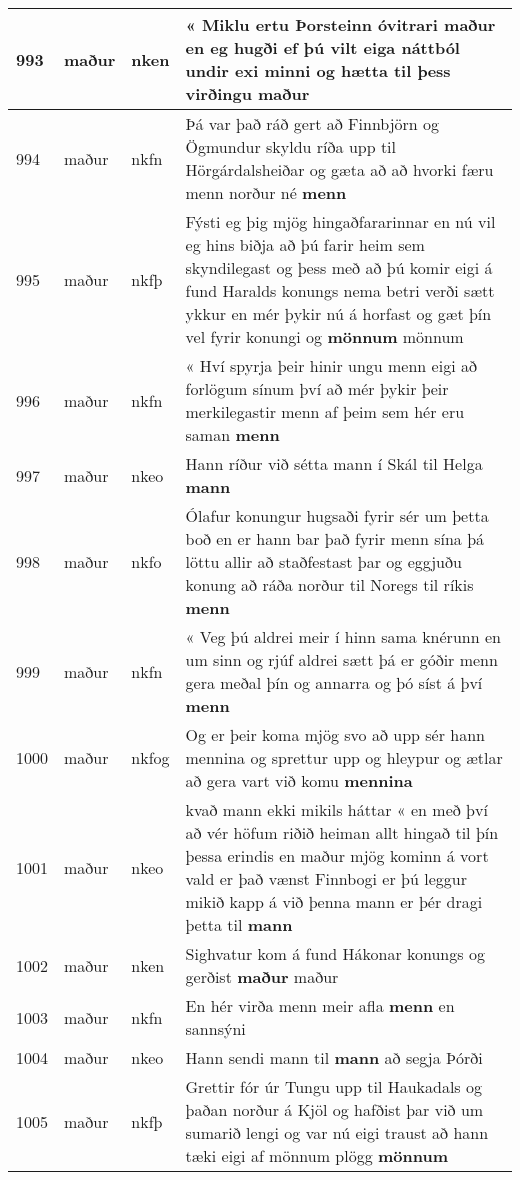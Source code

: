 \documentclass{article}
\begin{document}
\begin{longtable}{p{1cm}|p{1cm}|p{1cm}|p{13cm}}
\hline
993&maður&nken&« Miklu ertu Þorsteinn óvitrari maður en eg hugði ef þú vilt eiga náttból undir exi minni og hætta til þess virðingu \textbf{maður} \\
\hline
994&maður&nkfn&Þá var það ráð gert að Finnbjörn og Ögmundur skyldu ríða upp til Hörgárdalsheiðar og gæta að að hvorki færu menn norður né \textbf{menn} \\
\hline
995&maður&nkfþ&Fýsti eg þig mjög hingaðfararinnar en nú vil eg hins biðja að þú farir heim sem skyndilegast og þess með að þú komir eigi á fund Haralds konungs nema betri verði sætt ykkur en mér þykir nú á horfast og gæt þín vel fyrir konungi og \textbf{mönnum} mönnum\\
\hline
996&maður&nkfn&« Hví spyrja þeir hinir ungu menn eigi að forlögum sínum því að mér þykir þeir merkilegastir menn af þeim sem hér eru saman \textbf{menn} \\
\hline
997&maður&nkeo&Hann ríður við sétta mann í Skál til Helga \textbf{mann} \\
\hline
998&maður&nkfo&Ólafur konungur hugsaði fyrir sér um þetta boð en er hann bar það fyrir menn sína þá löttu allir að staðfestast þar og eggjuðu konung að ráða norður til Noregs til ríkis \textbf{menn} \\
\hline
999&maður&nkfn&« Veg þú aldrei meir í hinn sama knérunn en um sinn og rjúf aldrei sætt þá er góðir menn gera meðal þín og annarra og þó síst á því \textbf{menn} \\
\hline
1000&maður&nkfog&Og er þeir koma mjög svo að upp sér hann mennina og sprettur upp og hleypur og ætlar að gera vart við komu \textbf{mennina} \\
\hline
1001&maður&nkeo&kvað mann ekki mikils háttar « en með því að vér höfum riðið heiman allt hingað til þín þessa erindis en maður mjög kominn á vort vald er það vænst Finnbogi er þú leggur mikið kapp á við þenna mann er þér dragi þetta til \textbf{mann} \\
\hline
1002&maður&nken&Sighvatur kom á fund Hákonar konungs og gerðist \textbf{maður} maður\\
\hline
1003&maður&nkfn&En hér virða menn meir afla \textbf{menn} en sannsýni\\
\hline
1004&maður&nkeo&Hann sendi mann til \textbf{mann} að segja Þórði\\
\hline
1005&maður&nkfþ&Grettir fór úr Tungu upp til Haukadals og þaðan norður á Kjöl og hafðist þar við um sumarið lengi og var nú eigi traust að hann tæki eigi af mönnum plögg \textbf{mönnum} \\
\hline

\end{longtable}
\end{document}
